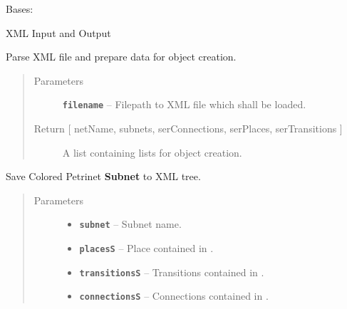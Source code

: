 \documentclass[a4paper,10pt,english]{sphinxmanual}
\begin{document}
\begin{fulllineitems}
\label{inout_link:inout.XMLIO.XMLIO}
Bases: 

XML Input and Output

\begin{fulllineitems}
\label{inout_link:inout.XMLIO.XMLIO.loadNet}
Parse XML file and prepare data for object creation.
\begin{quote}\begin{description}
\item[{Parameters}] \leavevmode
\textbf{\texttt{filename}} -- Filepath to XML file which shall be loaded.

\item[{Return {[} netName, subnets, serConnections, serPlaces, serTransitions {]}}] \leavevmode
A list containing lists for object creation.

\end{description}\end{quote}

\end{fulllineitems}


\begin{fulllineitems}
\label{inout_link:inout.XMLIO.XMLIO.netToXML}
Save Colored Petrinet \textbf{Subnet} to XML tree.
\begin{quote}\begin{description}
\item[{Parameters}] \leavevmode\begin{itemize}
\item {} 
\textbf{\texttt{subnet}} -- Subnet name.

\item {} 
\textbf{\texttt{placesS}} -- Place contained in .

\item {} 
\textbf{\texttt{transitionsS}} -- Transitions contained in .

\item {} 
\textbf{\texttt{connectionsS}} -- Connections contained in .


\end{itemize}
\end{description}
\end{quote}
\end{fulllineitems}
\end{fulllineitems}
\end{document}
